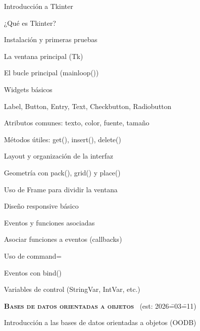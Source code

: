 \begin{longenum}
    \begin{longenum}
        \item Introducción a Tkinter
        \begin{longenum}
            \item ¿Qué es Tkinter?
            \item Instalación y primeras pruebas
            \item La ventana principal (Tk)
            \item El bucle principal (mainloop())
        \end{longenum}
        \item Widgets básicos
        \begin{longenum}
            \item Label, Button, Entry, Text, Checkbutton, Radiobutton
            \item Atributos comunes: texto, color, fuente, tamaño
            \item Métodos útiles: get(), insert(), delete()
        \end{longenum}
        \item Layout y organización de la interfaz
        \begin{longenum}
            \item Geometría con pack(), grid() y place()
            \item Uso de Frame para dividir la ventana
            \item Diseño responsive básico
        \end{longenum}
        \item Eventos y funciones asociadas
        \begin{longenum}
            \item Asociar funciones a eventos (callbacks)
            \item Uso de command=
            \item Eventos con bind()
            \item Variables de control (StringVar, IntVar, etc.)
        \end{longenum}
    \end{longenum}
    \item \textbf{\textsc{Bases de datos orientadas a objetos}} \ (est: 2026\==03\==11)
    \begin{longenum}
        \item Introducción a las bases de datos orientadas a objetos (OODB)
        \begin{longenum}

\end{longenum}
\end{longenum}
\end{longenum}
